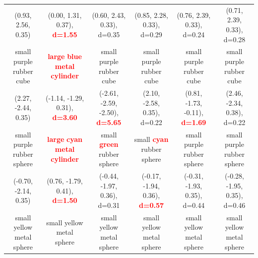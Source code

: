 \documentclass{article}
\begin{document}
\begin{table}[ht!]
{\begin{tabular}{cccccc}
          (0.93, 2.56, 0.35) &                                                                               (0.00, 1.31, 0.37), \textcolor{red}{\textbf{d=1.55}} &                               (0.60, 2.43, 0.33), d=0.35 &                              (0.85, 2.28, 0.33), d=0.29 &                              (0.76, 2.39, 0.33), d=0.24 &                              (0.71, 2.39, 0.33), d=0.28 \\
    small purple rubber cube &  \textcolor{red}{\textbf{large}} \textcolor{red}{\textbf{blue}} \textcolor{red}{\textbf{metal}} \textcolor{red}{\textbf{cylinder}} &                                 small purple rubber cube &                                small purple rubber cube &                                small purple rubber cube &                                small purple rubber cube \\
         (2.27, -2.44, 0.35) &                                                                             (-1.14, -1.29, 0.31), \textcolor{red}{\textbf{d=3.60}} &  (-2.61, -2.59, -2.50), \textcolor{red}{\textbf{d=5.65}} &                             (2.10, -2.58, 0.35), d=0.22 &  (0.81, -1.73, -0.11), \textcolor{red}{\textbf{d=1.69}} &                             (2.46, -2.34, 0.38), d=0.22 \\
  small purple rubber sphere &  \textcolor{red}{\textbf{large}} \textcolor{red}{\textbf{cyan}} \textcolor{red}{\textbf{metal}} \textcolor{red}{\textbf{cylinder}} &      small \textcolor{red}{\textbf{green}} rubber sphere &      small \textcolor{red}{\textbf{cyan}} rubber sphere &                              small purple rubber sphere &                              small purple rubber sphere \\
        (-0.70, -2.14, 0.35) &                                                                              (0.76, -1.79, 0.41), \textcolor{red}{\textbf{d=1.50}} &                             (-0.44, -1.97, 0.36), d=0.31 &  (-0.17, -1.94, 0.36), \textcolor{red}{\textbf{d=0.57}} &                            (-0.31, -1.93, 0.35), d=0.44 &                            (-0.28, -1.95, 0.35), d=0.46 \\
  small yellow metal sphere &                                                                                                          small yellow metal sphere &                                small yellow metal sphere &                               small yellow metal sphere &                               small yellow metal sphere &                               small yellow metal sphere \\

\end{tabular}}
\end{table}
\end{document}
